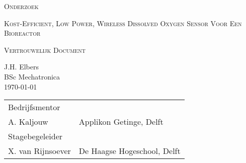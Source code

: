 \documentclass[12pt]{article}
\begin{document}
	\begin{titlepage}
		\centering
		\vspace{5cm}
		{\scshape\LARGE Onderzoek \par}
		{\scshape\large Kost-Efficient, Low Power, Wireless Dissolved Oxygen Sensor Voor Een Bioreactor\par}
		{\scshape\large Vertrouwelijk Document\par}
		
		
		\vspace{1.2cm}
		{J.H. Elbers\\}
		{BSc Mechatronica \\}
		{\today}
		\vfill
		\vfill

	\begin{tabular}{p{4cm}l} 
		Bedrijfsmentor &  \\
		A. Kaljouw & Applikon Getinge, Delft \\
		
		\medskip
		Stagebegeleider & \\ 
		X. van Rijnsoever & De Haagse Hogeschool, Delft \\
		
		
	\end{tabular}

\textit{}

\end{titlepage} 
\rmfamily
\pagestyle{default}


\newpage
\begin{multicols}{2}














\end{multicols}
\renewcommand\refname{Literatuurlijst}



\newpage

\end{document}
